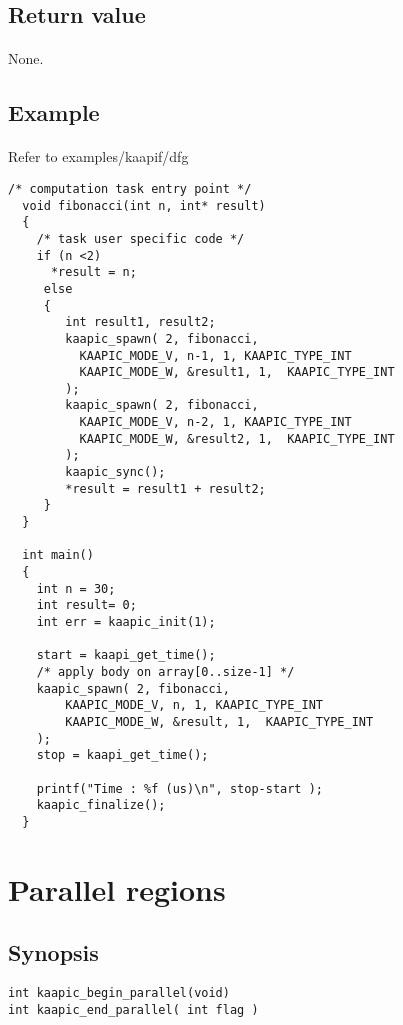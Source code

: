 \documentclass[a4paper, 11pt]{article}
\begin{document}
\subsection{Return value}
\paragraph{}
None.

\subsection{Example}\label{fibo}
\paragraph{}
Refer to examples/kaapif/dfg

\begin{small}
\begin{lstlisting}[frame=tb]
  /* computation task entry point */
  void fibonacci(int n, int* result)
  {
    /* task user specific code */
    if (n <2)
      *result = n;
     else 
     {
        int result1, result2;
        kaapic_spawn( 2, fibonacci, 
          KAAPIC_MODE_V, n-1, 1, KAAPIC_TYPE_INT
          KAAPIC_MODE_W, &result1, 1,  KAAPIC_TYPE_INT
        );
        kaapic_spawn( 2, fibonacci, 
          KAAPIC_MODE_V, n-2, 1, KAAPIC_TYPE_INT
          KAAPIC_MODE_W, &result2, 1,  KAAPIC_TYPE_INT
        );
        kaapic_sync();
        *result = result1 + result2;
     }
  }

  int main()
  {
    int n = 30;
    int result= 0;
    int err = kaapic_init(1);

    start = kaapi_get_time(); 
    /* apply body on array[0..size-1] */
    kaapic_spawn( 2, fibonacci, 
        KAAPIC_MODE_V, n, 1, KAAPIC_TYPE_INT
        KAAPIC_MODE_W, &result, 1,  KAAPIC_TYPE_INT
    );
    stop = kaapi_get_time(); 

    printf("Time : %f (us)\n", stop-start );
    kaapic_finalize();
  }
\end{lstlisting}
\end{small}


\newpage
\section{Parallel regions}

\subsection{Synopsis}
\begin{small}
\lstset{language=C}
\begin{lstlisting}[frame=tb]
int kaapic_begin_parallel(void)
int kaapic_end_parallel( int flag )
\end{lstlisting}
\end{small}
\end{document}
